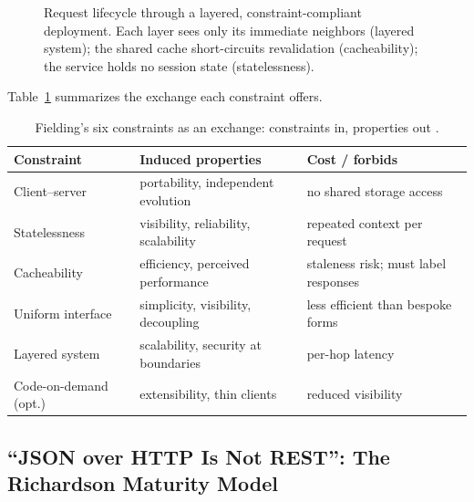 \begin{figure}[h]
\caption{Request lifecycle through a layered, constraint-compliant deployment.
Each layer sees only its immediate neighbors (layered system); the shared cache
short-circuits revalidation (cacheability); the service holds no session state
(statelessness).}
\label{fig:ch3-layered}
\end{figure}

Table~\ref{tab:ch3-constraints} summarizes the exchange each constraint offers.

\begin{table}[h]
  \centering
  \small
  \begin{tabularx}{\textwidth}{l X X}
    \toprule
    \textbf{Constraint} & \textbf{Induced properties} & \textbf{Cost / forbids} \\
    \midrule
    Client--server & portability, independent evolution & no shared storage access \\
    Statelessness & visibility, reliability, scalability & repeated context per request \\
    Cacheability & efficiency, perceived performance & staleness risk; must label responses \\
    Uniform interface & simplicity, visibility, decoupling & less efficient than bespoke forms \\
    Layered system & scalability, security at boundaries & per-hop latency \\
    Code-on-demand (opt.) & extensibility, thin clients & reduced visibility \\
    \bottomrule
  \end{tabularx}
  \caption{Fielding's six constraints as an exchange: constraints in, properties out \cite{fielding2000rest}.}
  \label{tab:ch3-constraints}
\end{table}

\subsection{``JSON over HTTP Is Not REST'': The Richardson Maturity Model}
\label{sec:ch3-rmm}

